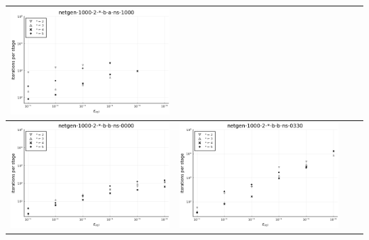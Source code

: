 \documentclass{article}
\begin{document}
\begin{landscape}
\begin{center}
\begin{longtable}{| c | c | c | c |}
\includegraphics[height=0.22\textheight]{itepst_fixlim_netgen-1000-2-_-b-a-ns-1000.png} \\
                \hline
\includegraphics[height=0.22\textheight]{itepst_fixlim_netgen-1000-2-_-b-b-ns-0000.png} &
\includegraphics[height=0.22\textheight]{itepst_fixlim_netgen-1000-2-_-b-b-ns-0330.png} &

\end{longtable}
\end{center}
\end{landscape}
\end{document}
